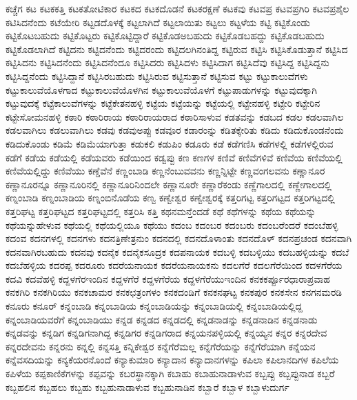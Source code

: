 {ಕಚ್ಚೆಗ
ಕಟ
ಕಟಕಕತ್ತಿ
ಕಟಕತೋಟಿಕಾರ
ಕಟಕದ
ಕಟಕದೊಡನೆ
ಕಟಕರಕ್ಷಣೆ
ಕಟಕವು
ಕಟವಪ್ರ
ಕಟವಪ್ರಗಿರಿ
ಕಟವಪ್ರಶೈಲ
ಕಟಿಸಿದನೆಂದು
ಕಟೆಯೇರಿ
ಕಟ್ಟಡದೊಳಕ್ಕೆ
ಕಟ್ಟಲಾಗಿದೆ
ಕಟ್ಟಲಾಯಿತು
ಕಟ್ಟಲು
ಕಟ್ಟಳೆಯ
ಕಟ್ಟಿ
ಕಟ್ಟಿಕೊಂಡು
ಕಟ್ಟಿಕೊಟಬಹುದು
ಕಟ್ಟಿಕೊಟ್ಟರು
ಕಟ್ಟಿಕೊಟ್ಟಿದ್ದಾರೆ
ಕಟ್ಟಿಕೊಡಅಬಹುದು
ಕಟ್ಟಿಕೊಡಬಹದ್ದು
ಕಟ್ಟಿಕೊಡಬಹುದು
ಕಟ್ಟಿಕೊಡಲಾಗಿದೆ
ಕಟ್ಟಿದನು
ಕಟ್ಟಿದನೆಂದು
ಕಟ್ಟಿದರಂದು
ಕಟ್ಟಿದಲಗಿನಂತಿದ್ದ
ಕಟ್ಟಿರುವ
ಕಟ್ಟಿಸಿ
ಕಟ್ಟಿಸಿಕೊಡುತ್ತಾನೆ
ಕಟ್ಟಿಸಿದ
ಕಟ್ಟಿಸಿದನು
ಕಟ್ಟಿಸಿದನೆಂದು
ಕಟ್ಟಿಸಿದನೆಂದೂ
ಕಟ್ಟಿಸಿದರು
ಕಟ್ಟಿಸಿದಳು
ಕಟ್ಟಿಸಿದಾಗ
ಕಟ್ಟಿಸಿದೆವು
ಕಟ್ಟಿಸಿದ್ದ
ಕಟ್ಟಿಸಿದ್ದನು
ಕಟ್ಟಿಸಿದ್ದನೆಂದು
ಕಟ್ಟಿಸಿದ್ದಾನೆ
ಕಟ್ಟಿಸಿರಬಹುದು
ಕಟ್ಟಿಸಿರುವ
ಕಟ್ಟಿಸುತ್ತಾನೆ
ಕಟ್ಟಿಸುವ
ಕಟ್ಟು
ಕಟ್ಟುಕಾಲುವೆಗಳು
ಕಟ್ಟುಕಾಲುವೆಯೊಳಗಾದ
ಕಟ್ಟುಕಾಲುವೆಯೊಳಗಿನ
ಕಟ್ಟುಕಾಲುವೆಯೊಳಗೆ
ಕಟ್ಟುಪಾಡುಗಳನ್ನು
ಕಟ್ಟುವುದಕ್ಕಾಗಿ
ಕಟ್ಟುವುದಕ್ಕೆ
ಕಟ್ಟೆಕಾಲುವೆಗಳನ್ನು
ಕಟ್ಟೆಕೇತನಹಳ್ಳಿ
ಕಟ್ಟೆಯ
ಕಟ್ಟೆಯನ್ನು
ಕಟ್ಟೆಯಲ್ಲಿ
ಕಟ್ಟೇನಹಳ್ಳಿ
ಕಟ್ಟೇರಿ
ಕಟ್ಟೇರಿನ
ಕಟ್ಟೇಸೋಮನಹಳ್ಳಿ
ಕಠಾರಿ
ಕಠಾರಿರಾಯ
ಕಠಾರಿರಾಯರಾದ
ಕಠಾರಿಸಾಳುವ
ಕಡತವನ್ನು
ಕಡಬದ
ಕಡಲ
ಕಡಲವಾಗಿಲ
ಕಡಲವಾಗಿಲು
ಕಡಲುವಾಗಿಲು
ಕಡವು
ಕಡವುಅಪ್ಪು
ಕಡವೂರ
ಕಡಾರಂನ್ನು
ಕಡಿತಕ್ಕೇರಿತು
ಕಡಿದು
ಕಡಿದುಕೊಂಡನೆಂದು
ಕಡಿದುಕೊಂಡು
ಕಡಿಮೆ
ಕಡಿಮೆಯಾಗುತ್ತಾ
ಕಡುಕಲಿ
ಕಡುಪಿಂ
ಕಡೂರು
ಕಡೆ
ಕಡೆಗಣಿಸಿ
ಕಡೆಗಳಲ್ಲಿ
ಕಡೆಗಳಲ್ಲಿರುವ
ಕಡೆಗೆ
ಕಡೆಯ
ಕಡೆಯಲ್ಲಿ
ಕಡೆಯವರು
ಕಡೆಯಿಂದ
ಕಡ್ವಪ್ಪು
ಕಣ
ಕಣಗಳ
ಕಣಿವೆ
ಕಣಿವೆಗಳಿವೆ
ಕಣಿವೆಯ
ಕಣಿವೆಯಲ್ಲಿ
ಕಣಿವೆಯಲ್ಲಿದ್ದು
ಕಣಿವೆಯು
ಕಣ್ಡೆವೆನೆ
ಕಣ್ಣಂಬಾಡಿ
ಕಣ್ಣನೆಂಬುವವನು
ಕಣ್ಣನ್ನಿಟ್ಟೇ
ಕಣ್ಣವಂಗಲವನು
ಕಣ್ಣಾನೂರ
ಕಣ್ಣಾನೂರನ್ನೂ
ಕಣ್ಣಾನೂರಿನಲ್ಲಿ
ಕಣ್ಣಾನೂರಿನಿಂದಲೇ
ಕಣ್ಣಾನೂರೇ
ಕಣ್ಣಾರೆಕಂಡು
ಕಣ್ಣೆಗಾಲದಲ್ಲಿ
ಕಣ್ಣೇಗಾಲದಲ್ಲಿ
ಕಣ್ನಂಬಾಡಿ
ಕಣ್ನಂಬಾಡಿಯ
ಕಣ್ನಂಬಿನೊಡೆಯ
ಕಣ್ವ
ಕಣ್ವೇಶ್ವರ
ಕಣ್ವೇಶ್ವರಕ್ಕೆ
ಕತ್ತರಿಗಟ್ಟ
ಕತ್ತರಿಗಟ್ಟದ
ಕತ್ತರಿಗಟ್ಟದಲ್ಲಿ
ಕತ್ತರಿಘಟ್ಟ
ಕತ್ತರಿಘಟ್ಟದ
ಕತ್ತರಿಘಟ್ಟದಲ್ಲಿ
ಕತ್ತರಿಸಿ
ಕತ್ತಿ
ಕಥನಮನ್ತೆಂದಡೆ
ಕಥೆ
ಕಥೆಗಳನ್ನು
ಕಥೆಯ
ಕಥೆಯನ್ನು
ಕಥೆಯನ್ನುಹೇಳುವ
ಕಥೆಯಲ್ಲಿ
ಕಥೆಯಲ್ಲಿಯೂ
ಕಥೆಯು
ಕದಂಬ
ಕದಂಬರ
ಕದಂಬರು
ಕದಂಬರೆಂದರೆ
ಕದಂಬೆಹಳ್ಳಿ
ಕದಂವ
ಕದನಗಳಲ್ಲಿ
ಕದನಗಳು
ಕದನತ್ರಿಣೇತ್ರನುಂ
ಕದನದಲ್ಲಿ
ಕದನದೊಳಾಂತು
ಕದನದೊಳ್
ಕದನಪ್ರಚಂಡ
ಕದನವಾಗಿ
ಕದನವಾಗಿರಬಹುದು
ಕದನವು
ಕದನೈಕ
ಕದನೈಕಸೂದ್ರಕ
ಕದಪನಾಯಕ
ಕದಬಳ್ಳಿ
ಕದಬಳ್ಳಿಯು
ಕದಬಹಳ್ಳಿಯನ್ನು
ಕದಬೆ
ಕದಬೆಹಳ್ಳಿಯ
ಕದರಪ್ಪ
ಕದರೂರು
ಕದರೆಯನಾಯಕ
ಕದರೆಯನಾಯಕನು
ಕದಲಗೆರೆ
ಕದಲಗೆರೆಯಿಂದ
ಕದಳಗೆರೆಯ
ಕದವಿ
ಕದವೆಹಳ್ಳಿ
ಕದ್ದಳಗೆರಇಂದಿನ
ಕದ್ದಳಗೆರೆ
ಕದ್ದಳಗೆರೆಯ
ಕದ್ದಳಗೆರೆಯುಇಂದಿನ
ಕನಕಕರ್ಪ್ಪೂರಧಾರಾಪ್ರವಾಹ
ಕನಕಗಿರಿ
ಕನಕಗಿರಿಯು
ಕನಕಚಾಮರ
ಕನಕಛತ್ರಂಗಳಂ
ಕನಕದಂಡಿಗೆ
ಕನಕನಘಟ್ಟ
ಕನಕಪುರ
ಕನಕಸೇನ
ಕನಗನಮರಡಿ
ಕನೂರು
ಕನೂರ್
ಕನ್ನಂಬಾಡಿ
ಕನ್ನಂಬಾಡಿಯ
ಕನ್ನಂಬಾಡಿಯನ್ನು
ಕನ್ನಂಬಾಡಿಯಲ್ಲಿ
ಕನ್ನಂಬಾಡಿಯಲ್ಲಿದ್ದ
ಕನ್ನಂಬಾಡಿಯವರೆಗೆ
ಕನ್ನಂಬಾಡಿಯು
ಕನ್ನಡ
ಕನ್ನಡದ
ಕನ್ನಡದಲ್ಲಿ
ಕನ್ನಡನಾಡನ್ನು
ಕನ್ನಡನಾಡಿನ
ಕನ್ನಡನಾಡು
ಕನ್ನಡವನ್ನು
ಕನ್ನಡಿಗ
ಕನ್ನಡಿಗನಾಗಿದ್ದ
ಕನ್ನಡಿಗರ
ಕನ್ನಡಿಗರಾದ
ಕನ್ನಯನಪಳ್ಳಿಯಲ್ಲಿ
ಕನ್ನಯ್ಯನ
ಕನ್ನರ
ಕನ್ನರದೇವ
ಕನ್ನರದೇವನು
ಕನ್ನರನು
ಕನ್ನಲ್ಲಿ
ಕನ್ನಸತ್ತಿ
ಕನ್ನಿಕೇಶ್ವರ
ಕನ್ನೆಗೆರೆಮಲ್ಲ
ಕನ್ನೆಗೆರೆಯನ್ನು
ಕನ್ನೆಗೆರೆಯಾಗಿ
ಕನ್ನೆಯನ
ಕನ್ನೆವಸದಿಯನ್ನು
ಕನ್ಯಕೆಯರನೊಂದೆ
ಕನ್ಯಾಕುಮಾರಿ
ಕನ್ಯಾದಾನ
ಕನ್ಯಾದಾನಗಳನ್ನು
ಕಪಿಲಾ
ಕಪಿಲಾನದಿಗಳ
ಕಪಿಲೆಯ
ಕಪಿಳೆಯ
ಕಪ್ಪಕಾಣಿಕೆಗಳನ್ನು
ಕಪ್ಪವನ್ನು
ಕಬರಸ್ಥಾನಕ್ಕಾಗಿ
ಕಬಾಹು
ಕಬಾಹುನಾಡಾಳುವ
ಕಬ್ಬಪ್ಪು
ಕಬ್ಬಪ್ಪುನಾಡ
ಕಬ್ಬರೆ
ಕಬ್ಬಹಲಿನ
ಕಬ್ಬಹಲು
ಕಬ್ಬಹು
ಕಬ್ಬಹುನಾಡಾಳುವ
ಕಬ್ಬಹುನಾಡಿನ
ಕಬ್ಬಾರೆ
ಕಬ್ಬಾಳ
ಕಬ್ಬಾಳುದುರ್ಗ
}
